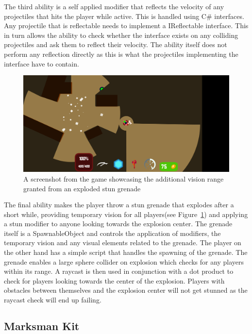 The third ability is a self applied modifier that reflects the velocity of any projectiles that hits the player while active. This is handled using C\# interfaces. Any projectile that is reflectable needs to implement a IReflectable interface. This in turn allows the ability to check whether the interface exists on any colliding projectiles and ask them to reflect their velocity. The ability itself does not perform any reflection directly as this is what the projectiles implementing the interface have to contain.

\begin{figure}[tbph]  %
  \centering
  \includegraphics[width=.75\textwidth]{images/stunGrenade}
  \caption[Screenshot of the brawler kit's stun grenade]{A screenshot from the game showcasing the additional vision range granted from an exploded stun grenade}
  \label{fig:brawlerStunGrenade}
\end{figure}

The final ability makes the player throw a stun grenade that explodes after a short while, providing temporary vision for all players(see Figure~\ref{fig:brawlerStunGrenade}) and applying a stun modifier to anyone looking towards the explosion center. The grenade itself is a SpawnableObject and controls the application of modifiers, the temporary vision and any visual elements related to the grenade. The player on the other hand has a simple script that handles the spawning of the grenade. The grenade enables a large sphere collider on explosion which checks for any players within its range. A raycast is then used in conjunction with a dot product to check for players looking towards the center of the explosion. Players with obstacles between themselves and the explosion center will not get stunned as the raycast check will end up failing. 

\subsection{Marksman Kit}
